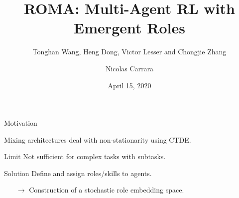 \documentclass{beamer}
\author[shortname]{Nicolas Carrara}
\institute[shortinst]{University of Toronto}
\title[ROMA]{ROMA: Multi-Agent RL with Emergent Roles}
\subtitle{Tonghan Wang, Heng Dong, Victor Lesser and Chongjie Zhang}
\date{April 15, 2020}
\begin{document}
    \begin{frame}
        \maketitle
        \centering
    \end{frame}

    \begin{frame}{Motivation}

        Mixing architectures deal with non-stationarity using CTDE.

        \pause
        \begin{alertblock}{Limit}
            Not sufficient for complex tasks with subtasks.
        \end{alertblock}
        \pause
        \begin{exampleblock}{Solution}
            Define and assign roles/skills to agents.
            \begin{itemize}
                \item[$\rightarrow$] Construction of a stochastic role embedding space.
            \end{itemize}
        \end{exampleblock}

    \end{frame}
\end{document}
